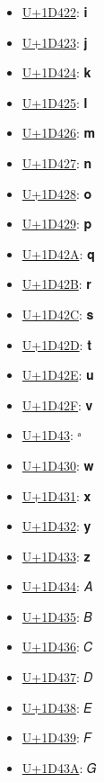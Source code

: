 \begin{itemize}
	\item \href{https://decodeunicode.org/en/u+1D422}{U+1D422}: 𝐢
	\item \href{https://decodeunicode.org/en/u+1D423}{U+1D423}: 𝐣
	\item \href{https://decodeunicode.org/en/u+1D424}{U+1D424}: 𝐤
	\item \href{https://decodeunicode.org/en/u+1D425}{U+1D425}: 𝐥
	\item \href{https://decodeunicode.org/en/u+1D426}{U+1D426}: 𝐦
	\item \href{https://decodeunicode.org/en/u+1D427}{U+1D427}: 𝐧
	\item \href{https://decodeunicode.org/en/u+1D428}{U+1D428}: 𝐨
	\item \href{https://decodeunicode.org/en/u+1D429}{U+1D429}: 𝐩
	\item \href{https://decodeunicode.org/en/u+1D42A}{U+1D42A}: 𝐪
	\item \href{https://decodeunicode.org/en/u+1D42B}{U+1D42B}: 𝐫
	\item \href{https://decodeunicode.org/en/u+1D42C}{U+1D42C}: 𝐬
	\item \href{https://decodeunicode.org/en/u+1D42D}{U+1D42D}: 𝐭
	\item \href{https://decodeunicode.org/en/u+1D42E}{U+1D42E}: 𝐮
	\item \href{https://decodeunicode.org/en/u+1D42F}{U+1D42F}: 𝐯
	\item \href{https://decodeunicode.org/en/u+1D43}{U+1D43}: ᵃ
	\item \href{https://decodeunicode.org/en/u+1D430}{U+1D430}: 𝐰
	\item \href{https://decodeunicode.org/en/u+1D431}{U+1D431}: 𝐱
	\item \href{https://decodeunicode.org/en/u+1D432}{U+1D432}: 𝐲
	\item \href{https://decodeunicode.org/en/u+1D433}{U+1D433}: 𝐳
	\item \href{https://decodeunicode.org/en/u+1D434}{U+1D434}: 𝐴
	\item \href{https://decodeunicode.org/en/u+1D435}{U+1D435}: 𝐵
	\item \href{https://decodeunicode.org/en/u+1D436}{U+1D436}: 𝐶
	\item \href{https://decodeunicode.org/en/u+1D437}{U+1D437}: 𝐷
	\item \href{https://decodeunicode.org/en/u+1D438}{U+1D438}: 𝐸
	\item \href{https://decodeunicode.org/en/u+1D439}{U+1D439}: 𝐹
	\item \href{https://decodeunicode.org/en/u+1D43A}{U+1D43A}: 𝐺

\end{itemize}

